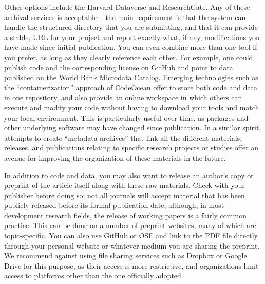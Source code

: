 Other options include the Harvard Dataverse
and ResearchGate.
Any of these archival services is acceptable --
the main requirement is that the system can handle
the structured directory that you are submitting,
and that it can provide a stable, URL for your project
and report exactly what, if any,
modifications you have made since initial publication.
You can even combine more than one tool if you prefer,
as long as they clearly reference each other.
For example, one could publish code and the corresponding license on GitHub
and point to data published on the World Bank Microdata Catalog.
Emerging technologies such as the ``containerization'' approach of CodeOcean
offer to store both code and data in one repository,
and also provide an online workspace in which others can execute and modify your code
without having to download your tools and match your local environment.
This is particularly useful over time, as packages and other underlying software may have changed since publication.
In a similar spirit, attempts to create ``metadata archives''
that link all the different materials, releases, and publications
relating to specific research projects or studies
offer an avenue for improving the organization of these materials in the future.

In addition to code and data,
you may also want to release an author's copy or preprint
of the article itself along with these raw materials.
Check with your publisher before doing so;
not all journals will accept material that has been publicly released
before its formal publication date, although,
in most development research fields,
the release of working papers is a fairly common practice.
This can be done on a number of preprint websites,
many of which are topic-specific.
You can also use GitHub or OSF and link to the PDF file directly
through your personal website or whatever medium you are sharing the preprint.
We recommend against using file sharing services such as
Dropbox or Google Drive for this purpose,
as their access is more restrictive,
and organizations limit access to platforms other than the one officially adopted.
